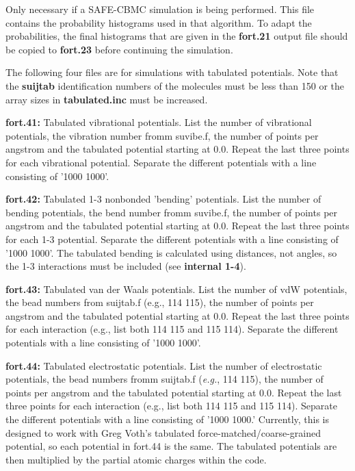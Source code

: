 \documentclass[12pt,letterpaper]{article}
\begin{document}
{{{{{{{
Only necessary if a SAFE-CBMC simulation is being performed. 
This file contains the probability histograms used in that algorithm.  
To adapt the probabilities, the final histograms that are given in the {\bf
fort.21} output file should be copied to {\bf fort.23} before continuing the simulation.  

\noindent The following four files are for simulations with tabulated potentials.  Note that the {\bf suijtab} identification numbers of the
molecules must be less than 150 or the array sizes in {\bf tabulated.inc} must be increased.

\noindent \textbf{fort.41:}  Tabulated vibrational potentials.  List the number of vibrational potentials, the 
vibration number fromm suvibe.f, the number of points per angstrom and the tabulated potential
starting at 0.0.  Repeat the last three points for each vibrational potential.  Separate the different
potentials with a line consisting of '1000 1000'.

\noindent \textbf{fort.42:}  Tabulated 1-3 nonbonded 'bending' potentials.  List the number of bending potentials, the bend number fromm suvibe.f, the number of points per angstrom and the tabulated potential
starting at 0.0.  Repeat the last three points for each 1-3 potential.  Separate the different potentials
with a line consisting of '1000 1000'.
The tabulated bending is calculated using distances, not angles, so the 1-3 interactions
must be included (see \textbf{internal 1-4}).

\noindent \textbf{fort.43:}  Tabulated van der Waals potentials.  List the number of vdW potentials, the 
bead numbers from suijtab.f (e.g., 114 115), the number of points per angstrom and the tabulated potential
starting at 0.0.  Repeat the last three points for each interaction (e.g., list both 114 115 and 115 114).  
Separate the different potentials with a line consisting of '1000 1000'.

\noindent \textbf{fort.44:}  Tabulated electrostatic potentials.  List the number of electrostatic potentials, the 
bead numbers fromm suijtab.f (\textit{e.g.}, 114 115), the number of points per angstrom and the tabulated potential starting at 0.0.  Repeat the last three points for each interaction (e.g., list both 114 115 and 115 114).  
Separate the different potentials with a line consisting of '1000 1000.'  Currently, this is designed to
work with Greg Voth's tabulated force-matched/coarse-grained potential, so each potential in fort.44 is the same.
The tabulated potentials are then multiplied by the partial atomic charges within the code.

}}}}}}}
\end{document}

